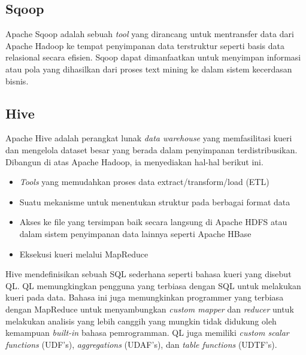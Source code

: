 \begin{enumerate}
\end{enumerate}

\subsection{Sqoop}
\label{sec:sqoop}
Apache Sqoop adalah sebuah \textit{tool} yang dirancang untuk mentransfer data dari Apache Hadoop ke tempat penyimpanan data terstruktur seperti basis data relasional secara efisien. Sqoop dapat dimanfaatkan untuk menyimpan informasi atau pola yang dihasilkan dari proses text mining ke dalam sistem kecerdasan bisnis. \cite{sqoop:2015}

\subsection{Hive}
\label{sec:hive}
Apache Hive adalah perangkat lunak \textit{data warehouse} yang memfasilitasi kueri dan mengelola dataset besar yang berada dalam penyimpanan terdistribusikan. Dibangun di atas Apache Hadoop, ia menyediakan hal-hal berikut ini.\cite{hive:2015}

\begin{itemize}
	\item \textit{Tools} yang memudahkan proses data extract/transform/load (ETL)
	\item Suatu mekanisme untuk menentukan struktur pada berbagai format data
	\item Akses ke file yang tersimpan baik secara langsung di Apache HDFS atau dalam sistem penyimpanan data lainnya seperti Apache HBase
	\item Eksekusi kueri melalui MapReduce
\end{itemize}

Hive mendefinisikan sebuah SQL sederhana seperti bahasa kueri yang disebut QL. QL memungkingkan pengguna yang terbiasa dengan SQL untuk melakukan kueri pada data. Bahasa ini juga memungkinkan programmer yang terbiasa dengan MapReduce untuk menyambungkan \textit{custom mapper} dan \textit{reducer} untuk melakukan analisis yang lebih canggih yang mungkin tidak didukung oleh kemampuan \textit{built-in} bahasa pemrogramman. QL juga memiliki \textit{custom scalar functions} (UDF's), \textit{aggregations} (UDAF's), dan \textit{table functions} (UDTF's). \cite{sqoop:2015}